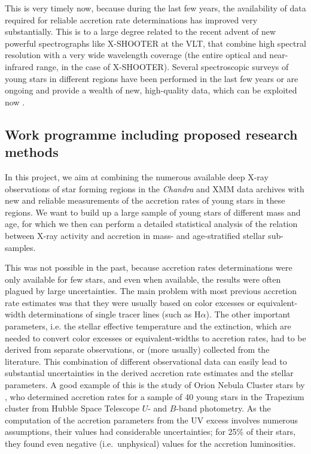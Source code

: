\documentclass[10pt,fleqn,twoside]{article}
\newcommand{\Tcol}{\color{blue}}
\begin{document}
This is very timely now, because during the last few years,
the availability of data required for
reliable accretion rate determinations  has improved very substantially.
This is to a large degree related to
the recent advent of new powerful spectrographs like
X-SHOOTER at the VLT, that combine high spectral resolution
with a very wide wavelength coverage (the entire optical and
near-infrared range, in the case of X-SHOOTER).
Several spectroscopic surveys of young stars in different regions
have been performed in the last few years or are ongoing and provide a wealth
of new, high-quality data, which can be exploited now
\citep[see][]{MT14}.






\subsection{\Tcol Work programme including proposed research methods}





In this project, we aim at combining the numerous available deep
X-ray observations of star forming regions in the \textit{Chandra} 
and XMM data
archives with new and reliable measurements of the accretion 
rates of young stars in these regions.
We want to build up a large sample of young stars of different mass
and  age,
for which we then can perform a detailed statistical analysis
of the relation between X-ray activity and accretion in mass- 
and age-stratified stellar sub-samples. 


This was not possible in the past, because accretion rates determinations were only
available for few stars, and even when available, the results were often
plagued by large uncertainties.
%
The main problem with most  previous accretion rate estimates was
 that they were usually
based on color excesses or equivalent-width determinations of single tracer lines
(such as H$\alpha$). The other important parameters, i.e. the  stellar effective
temperature and the extinction, which are needed to convert color excesses or
equivalent-widths to accretion rates, had to be derived from separate observations,
or (more usually) collected from the literature.
This combination of different observational data can easily lead to
substantial uncertainties in the derived accretion rate estimates and the stellar parameters.
%
%
A good example of this is the  study of Orion Nebula Cluster stars by \citet{Robberto04},
who determined
accretion rates for a sample of 40
young stars in the Trapezium cluster from Hubble Space Telescope $U$- and $B$-band photometry.
As the computation of the accretion parameters                          
from the UV excess 
involves numerous assumptions, their values had
considerable uncertainties; for 25\% of their
stars, they found even negative (i.e.~unphysical) values for the accretion luminosities.
\end{document}
